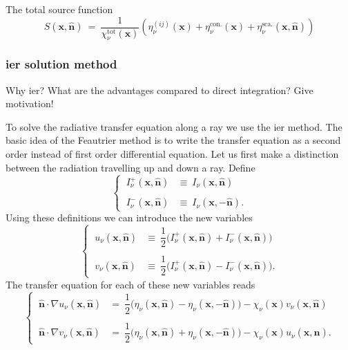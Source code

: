 \documentclass[]{article}
\begin{document}
The total source function
\begin{equation}
S(\textbf{x}, \hat{\textbf{n}}) \ = \ \frac{1}{\chi^{\text{tot}}_{\nu}(\textbf{x})} \left( \eta^{(ij)}_{\nu}(\textbf{x}) + \eta^{\text{con.}}_{\nu}(\textbf{x}) + \eta^{\text{sca.}}_{\nu}(\textbf{x}, \hat{\textbf{n}}) \right)
\end{equation}


\subsubsection{ier solution method}

Why ier? What are the advantages compared to direct integration? Give motivation!

\bigskip

To solve the radiative transfer equation along a ray we use the ier method. The basic idea of the Feautrier method is to write the transfer equation as a second order instead of first order differential equation. Let us first make a distinction between the radiation travelling up and down a ray. Define
\begin{equation}
\begin{cases}
\ I^{+}_{\nu}(\textbf{x},\hat{\textbf{n}})  &\equiv \ I_{\nu}(\textbf{x},\hat{\textbf{n}}) \\ \\
\ I^{-}_{\nu}(\textbf{x},\hat{\textbf{n}})  &\equiv \ I_{\nu}(\textbf{x},-\hat{\textbf{n}}) .
\end{cases}
\end{equation}
Using these definitions we can introduce the new variables
\begin{equation}
\begin{cases}
\ u_{\nu}(\textbf{x},\hat{\textbf{n}})  &\equiv \ \dfrac{1}{2}\Big( I^{+}_{\nu}(\textbf{x},\hat{\textbf{n}}) + I^{-}_{\nu}(\textbf{x},\hat{\textbf{n}}) \Big) \\ \\
\ v_{\nu}(\textbf{x},\hat{\textbf{n}})  &\equiv \ \dfrac{1}{2}\Big( I^{+}_{\nu}(\textbf{x},\hat{\textbf{n}}) - I^{-}_{\nu}(\textbf{x},\hat{\textbf{n}}) \Big) .
\end{cases}
\end{equation}
The transfer equation for each of these new variables reads
\begin{equation}
\begin{cases}
\ \hat{\textbf{n}} \cdot \nabla u_{\nu}(\textbf{x},\hat{\textbf{n}}) &= \ \dfrac{1}{2} \Big( \eta_{\nu}(\textbf{x},\hat{\textbf{n}}) - \eta_{\nu}(\textbf{x},-\hat{\textbf{n}}) \Big) - \chi_{\nu}(\textbf{x}) v_{\nu}(\textbf{x},\hat{\textbf{n}}) \\ \\
\ \hat{\textbf{n}} \cdot \nabla v_{\nu}(\textbf{x},\hat{\textbf{n}}) &= \ \dfrac{1}{2} \Big( \eta_{\nu}(\textbf{x},\hat{\textbf{n}}) + \eta_{\nu}(\textbf{x},-\hat{\textbf{n}}) \Big) - \chi_{\nu}(\textbf{x}) u_{\nu}(\textbf{x},\hat{\textbf{n}}) .
\end{cases}
\label{uv}
\end{equation}
\end{document}
